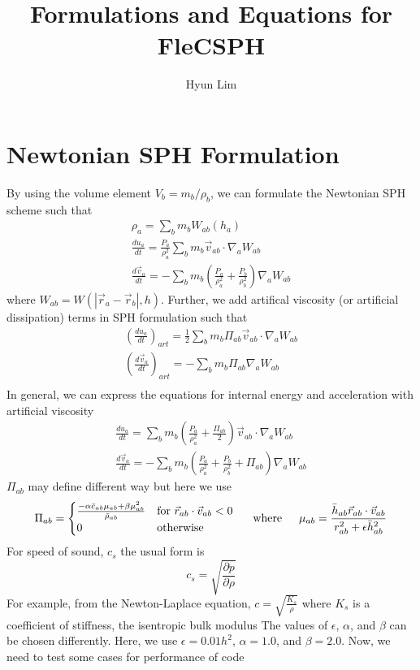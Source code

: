 \documentclass{article}
\begin{document}
\title{Formulations and Equations for FleCSPH}

\author{Hyun Lim}

\maketitle

\section{Newtonian SPH Formulation}
By using the volume element $V_b = m_b / \rho_b$, we can formulate the Newtonian SPH scheme such that
\begin{align}
\rho_a = \sum_b m_b W_{ab} (h_a) \\
\frac{d u_a}{dt} = \frac{P_a}{\rho_a^2} \sum_b m_b \vec{v}_{ab} \cdot \nabla_a W_{ab} \\
\frac{d \vec{v}_a}{d t} = - \sum_b m_b \left(\frac{P_a}{\rho_a^2} + \frac{P_b}{\rho_b^2} \right) \nabla_a W_{ab}
\end{align}
where $W_{ab} = W(| \vec{r}_a - \vec{r}_b |,h)$. Further, we add artifical viscosity (or artificial dissipation) terms in SPH formulation such that
\begin{align}
\left(\frac{d u_a}{dt} \right)_{art} = \frac{1}{2} \sum_b m_b \Pi_{ab} \vec{v}_{ab} \cdot \nabla_a W_{ab}\\
\left(\frac{d\vec{v}_a}{dt} \right)_{art} = - \sum_b m_b \Pi_{ab}\nabla_a W_{ab}\\
\end{align}
In general, we can express the equations for internal energy and acceleration with artificial viscosity
\begin{align}
\frac{d u_a}{dt} = \sum_b m_b \left(\frac{P_a}{\rho_a^2} + \frac{\Pi_{ab}}{2} \right) \vec{v}_{ab} \cdot \nabla_a W_{ab} \\
\frac{d \vec{v}_a}{d t} = - \sum_b m_b \left(\frac{P_a}{\rho_a^2} + \frac{P_b}{\rho_b^2} + \Pi_{ab} \right) \nabla_a W_{ab}
\end{align}
$\Pi_{ab}$ may define different way but here we use
\begin{equation}
\Pi_{ab} = \begin{cases}
\frac{- \alpha \bar{c}_{ab} \mu_{ab} + \beta \mu_{ab}^2}{\bar{\rho}_{ab}} & \text{for $\vec{r}_{ab} \cdot \vec{v}_{ab} < 0$} \\
0 & \text{otherwise}
\end{cases}
\indent \text{where} \indent \mu_{ab} = \frac{\bar{h}_{ab} \vec{r}_{ab} \cdot \vec{v}_{ab}}{r^2_{ab} + \epsilon \bar{h}_{ab}^2}
\end{equation}
For speed of sound, $c_s$ the usual form is
\begin{equation}
c_s = \sqrt{\frac{\partial p}{\partial \rho}}
\end{equation}
For example, from the Newton-Laplace equation, $c = \sqrt{\frac{K_s}{\rho}}$ where $K_s$ is a coefficient of stiffness, the isentropic bulk modulus
The values of $\epsilon$, $\alpha$, and $\beta$ can be chosen differently. Here, we use $\epsilon = 0.01h^2$, $\alpha = 1.0$, and $\beta = 2.0$.
Now, we need to test some cases for performance of code
\end{document}
